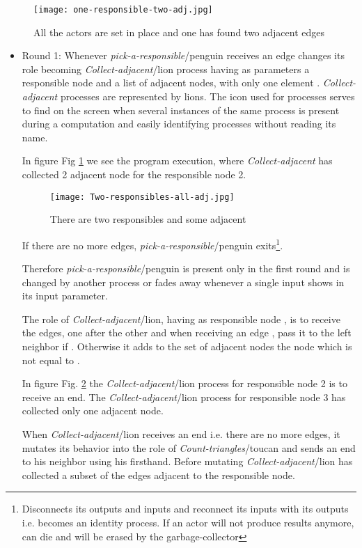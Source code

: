 \documentclass{article}                     \usepackage{graphics}
\begin{document}
\begin{figure}[h]
	\centering
	\texttt{[image: one-responsible-two-adj.jpg]}
	\caption{All the actors are set in place and  one has found two adjacent edges}
	\label{stage0.1}
\end{figure}
\begin{itemize}
\item Round 1:  Whenever \textit{pick-a-responsible}/penguin receives an edge    changes its role becoming  \textit{Collect-adjacent}/lion process having as parameters a  responsible node   and a list of adjacent nodes, with only one element .  \textit{Collect-adjacent} processes are represented by lions. The icon used for processes serves to find on the screen when several instances of the same process is present during a computation and easily identifying processes without reading its name.


In figure Fig \ref{stage0.1} we see the program execution, where  \textit{Collect-adjacent} has collected 2 adjacent node for the responsible node 2.

\begin{figure}[h]
	\centering
	\texttt{[image: Two-responsibles-all-adj.jpg]}
	\caption{There are two responsibles and some adjacent}
	\label{stage1}
\end{figure}
If there are no more edges, \textit{pick-a-responsible}/penguin exits\footnote{Disconnects its outputs and inputs and reconnect its inputs with its outputs i.e. becomes an identity process. If an actor will not produce results anymore, can die and will be erased by the garbage-collector}.



Therefore  \textit{pick-a-responsible}/penguin is present only in the first round and is changed by another process or fades away whenever a single input shows in its input parameter.

The role of  \textit{Collect-adjacent}/lion, having as responsible node ,   is to receive the edges, one after the other and when receiving an edge , pass it to the left neighbor if  . Otherwise it adds to the set of adjacent nodes the node which is not equal to .

In figure Fig. \ref{stage1}   the \textit{Collect-adjacent}/lion process  for responsible node 2 is to receive an end. The \textit{Collect-adjacent}/lion process  for responsible node 3 has collected only one adjacent node.

When  \textit{Collect-adjacent}/lion  receives an end i.e. there are no more edges, it mutates its behavior into the role of \textit{Count-triangles}/toucan and sends an end to his neighbor  using his firsthand. Before mutating  \textit{Collect-adjacent}/lion  has collected a subset of the edges adjacent to the responsible node.




\end{itemize}
\end{document}
